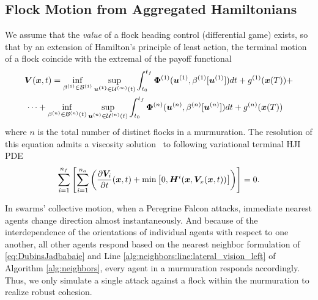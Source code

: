 \subsection{Flock Motion from Aggregated Hamiltonians}
We assume that the \textit{value} of a flock heading control (differential game) exists, so that by an extension of Hamilton's principle of least action, the terminal motion of a flock coincide with the extremal of the payoff functional 
%
\begin{align}
	&\bm{V}(\bm{x}, t) = \inf_{\beta^{(1)} \in \mathcal{B}^{(1)}} \sup_{\bm{u^{(1)}} \in \mathcal{U^{(1)}}(t)} \int_{t_0}^{t_f} \bm{\Phi}^{(1)} (\bm{u}^{(1)}, \beta^{(1)}[\bm{u}^{(1)}])dt + g^{(1)}(\bm{x}(T)) + \nonumber
	\\
	&\, \cdots + \inf_{\beta^{(n)} \in \mathcal{B}^{(n)}(t)} \sup_{\bm{u}^{(n)} \in \mathcal{U}^{(n)}(t)} \int_{t_0}^{t_f} \bm{\Phi}^{(n)} (\bm{u}^{(n)}, \beta^{(n)}[\bm{u}^{(n)}])dt + g^{(n)}(\bm{x}(T))
\end{align}
%
%
where $n$ is the total number of distinct flocks in a murmuration. The resolution of this equation  admits a viscosity solution~\cite{Evans1984} to following variational terminal HJI PDE \cite{Mitchell2005}
%
\begin{align}
	\sum_{i=1}^{n_f}\left[\sum_{i=1}^{n_a}\left(\dfrac{\partial \bm{V}_i}{\partial t}(\bm{x}, t) + \min \left[0, \bm{H}^i(\bm{x}, \bm{V}_x(\bm{x}, t))\right]\right)\right] = 0.
\end{align}
%

In swarms' collective motion, when \eg a Peregrine Falcon attacks, immediate nearest agents change direction almost instantaneously. And because of the interdependence of the orientations of individual agents with respect to one another, all other agents respond based on the nearest neighbor formulation of \eqref{eq:DubinsJadbabaie} and Line \ref{alg:neighbors:line:lateral_vision_left} of Algorithm \ref{alg:neighbors}, every agent in a murmuration responds accordingly. Thus, we only simulate a single attack against a flock within the murmuration to realize robust cohesion.  

